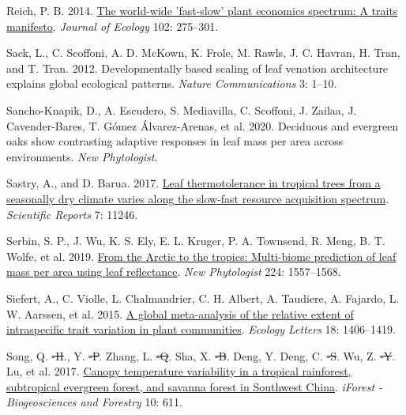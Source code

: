 \documentclass[
  12pt,
  a4paper,
,tablecaptionabove
]{scrartcl}
\newlength{\cslhangindent}
\newenvironment{CSLReferences}[2] %
 {%
  \setlength{\parindent}{0pt}
  \ifodd #1 \everypar{\setlength{\hangindent}{\cslhangindent}}\ignorespaces\fi
  \ifnum #2 > 0
  \setlength{\parskip}{#2\baselineskip}
  \fi
 }%
 {}
\providecommand{\DIFaddtex}[1]{{\protect\color{blue}\uwave{#1}}} %
\providecommand{\DIFdeltex}[1]{{\protect\color{red}\sout{#1}}}                      %
\providecommand{\DIFaddbegin}{} %
\providecommand{\DIFaddend}{} %
\providecommand{\DIFdelbegin}{} %
\providecommand{\DIFdelend}{} %
\providecommand{\DIFadd}[1]{\texorpdfstring{\DIFaddtex{#1}}{#1}} %
\providecommand{\DIFdel}[1]{\texorpdfstring{\DIFdeltex{#1}}{}} %
\begin{document}
\begin{CSLReferences}{1}{0}
\leavevmode{}%
Reich, P. B. 2014. \href{https://doi.org/10.1111/1365-2745.12211}{The world-wide 'fast-slow' plant economics spectrum: {A} traits manifesto}. \emph{Journal of Ecology} 102: 275--301.

\leavevmode{}%
Sack, L., C. Scoffoni, A. D. McKown, K. Frole, M. Rawls, J. C. Havran, H. Tran, and T. Tran. 2012. Developmentally based scaling of leaf venation architecture explains global ecological patterns. \emph{Nature Communications} 3: 1--10.

\leavevmode{}%
Sancho-Knapik, D., A. Escudero, S. Mediavilla, C. Scoffoni, J. Zailaa, J. Cavender-Bares, T. Gómez Álvarez-Arenas, et al. 2020. Deciduous and evergreen oaks show contrasting adaptive responses in leaf mass per area across environments. \emph{New Phytologist}\DIFaddbegin \DIFadd{: 521--534}\DIFaddend .

\leavevmode{}%
Sastry, A., and D. Barua. 2017. \href{https://doi.org/10.1038/s41598-017-11343-5}{Leaf thermotolerance in tropical trees from a seasonally dry climate varies along the slow-fast resource acquisition spectrum}. \emph{Scientific Reports} 7: 11246.

\leavevmode{}%
Serbin, S. P., J. Wu, K. S. Ely, E. L. Kruger, P. A. Townsend, R. Meng, B. T. Wolfe, et al. 2019. \href{https://doi.org/10.1111/nph.16123}{From the {Arctic} to the tropics: Multi-biome prediction of leaf mass per area using leaf reflectance}. \emph{New Phytologist} 224: 1557--1568.

\leavevmode{}%
Siefert, A., C. Violle, L. Chalmandrier, C. H. Albert, A. Taudiere, A. Fajardo, L. W. Aarssen, et al. 2015. \href{https://doi.org/10.1111/ele.12508}{A global meta-analysis of the relative extent of intraspecific trait variation in plant communities}. \emph{Ecology Letters} 18: 1406--1419.

\leavevmode{}%
Song, Q. \DIFdelbegin \DIFdel{-H}\DIFdelend \DIFaddbegin \DIFadd{H}\DIFaddend ., Y. \DIFdelbegin \DIFdel{-P}\DIFdelend \DIFaddbegin \DIFadd{P}\DIFaddend . Zhang, L. \DIFdelbegin \DIFdel{-Q}\DIFdelend \DIFaddbegin \DIFadd{Q}\DIFaddend . Sha, X. \DIFdelbegin \DIFdel{-B}\DIFdelend \DIFaddbegin \DIFadd{B}\DIFaddend . Deng, Y. Deng, C. \DIFdelbegin \DIFdel{-S}\DIFdelend \DIFaddbegin \DIFadd{S}\DIFaddend . Wu, Z. \DIFdelbegin \DIFdel{-Y}\DIFdelend \DIFaddbegin \DIFadd{Y}\DIFaddend . Lu, et al. 2017. \href{https://doi.org/10.3832/ifor2223-010}{Canopy temperature variability in a tropical rainforest, subtropical evergreen forest, and savanna forest in {Southwest China}}. \emph{iForest - Biogeosciences and Forestry} 10: 611.


\end{CSLReferences}
\end{document}
